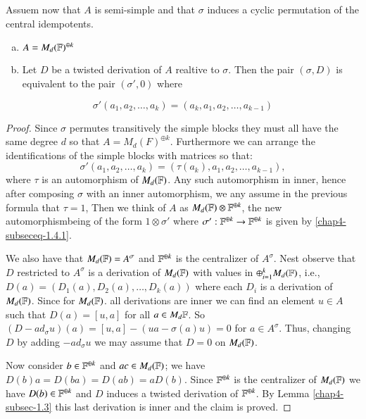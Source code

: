 Assuem now that $A$ is semi-simple and that $\sigma$ induces a cyclic permutation of the central idempotents.

\newpage

\begin{lemma*}
\begin{enumerate}[(a)]
\item $A= M_{d}(\mathbb{F})^{\oplus k}$ \label{chap4-enum-(a)}
\item Let $D$ be a twisted derivation of $A$ realtive to $\sigma$. Then the pair $(\sigma, D)$ is equivalent to the pair $(\sigma', 0)$ where\label{chap4-enum-(b)}
\end{enumerate}
\end{lemma*}
\begin{equation*}\label{chap4-subseceq-1.4.1}
\sigma'(a_{1}, a_{2},\ldots, a_{k}) = (a_{k},a_{1}, a_{2}, \ldots, a_{k-1})\tag{1.4.1}
\end{equation*}

\begin{proof}
Since $\sigma$ permutes transitively the simple blocks they must all have the same degree $d$ so that $A=M_{d}(F)^{\oplus k}$. Furthermore we can arrange the identifications of the simple blocks with matrices so that: 
$$
\sigma'(a_{1}, a_{2},\ldots, a_{k}) = (\tau(a_{k}),a_{1}, a_{2}, \ldots, a_{k-1}),
$$
where $\tau$ is an automorphism of $M_{d}(\mathbb{F})$. Any such automorphism in inner, hence after composing $\sigma$ with an inner automorphism, we any assume in the previous formula that $\tau =1$, Then we think of $A$ as $M_{d}(\mathbb{F})\otimes \mathbb{F}^{\oplus k}$, the new automorphism\pageoriginale being of the form $1\otimes \sigma'$ where $\sigma':\mathbb{F}^{\oplus k} \rightarrow
 \mathbb{F}^{\oplus k}$ is given by \eqref{chap4-subseceq-1.4.1}.

 We also have that $M_{d}(\mathbb{F}) = A^{\sigma}$ and $\mathbb{F}^{\oplus k}$ is the centralizer of $A^{\sigma}$. Nest observe that $D$ restricted to $A^{\sigma}$ is a derivation of $M_{d}(\mathbb{F})$ with values in $\oplus_{i=1}^{k}M_{d}(\mathbb{F})$, i.e., $D(a)= (D_{1}(a), D_{2}(a), \ldots, D_{k}(a))$ where each $D_{i}$ is a derivation of $M_{d}(\mathbb{F})$. Since for $M_{d}(\mathbb{F})$. all derivations are inner we can find an element $u \in A$ such that $D(a) =[u,a]$ for all $a\in M_{d}\mathbb{F}$. So $(D-ad_{\sigma}u)(a) = [u,a]-(ua-\sigma(a)u)=0$ for $a\in A^{\sigma}$. Thus, changing $D$ by adding $-ad_{\sigma}u$ we may assume that $D=0$ on $M_{d}(\mathbb{F})$.

 Now consider $b \in \mathbb{F}^{\oplus k}$ and $ac\in M_{d}(\mathbb{F})$; we have $D(b)a = D(ba) = D(ab) =aD(b)$. Since $\mathbb{F}^{\oplus k}$ is the centralizer of $M_{d}(\mathbb{F})$ we have $D(b)\in \mathbb{F}^{\oplus k}$ and $D$ induces a twisted derivation of $\mathbb{F}^{\oplus k}$. By Lemma \ref{chap4-subsec-1.3} this last derivation is inner and the claim is proved.
\end{proof}

